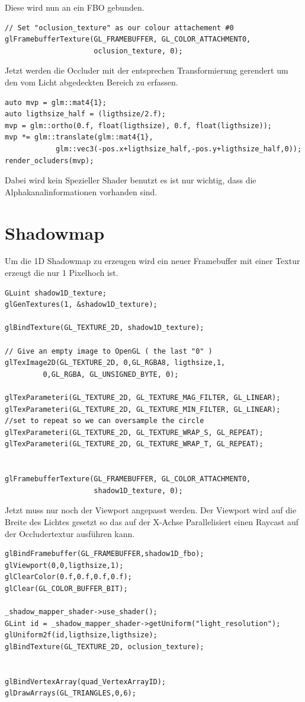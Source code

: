 Diese wird nun an ein FBO gebunden.
\begin{lstlisting}
// Set "oclusion_texture" as our colour attachement #0
glFramebufferTexture(GL_FRAMEBUFFER, GL_COLOR_ATTACHMENT0, 
					 oclusion_texture, 0);
\end{lstlisting}

Jetzt werden die Occluder mit der entsprechen Transformierung gerendert um den vom Licht abgedeckten Bereich zu erfassen.
\begin{lstlisting}
auto mvp = glm::mat4{1};
auto ligthsize_half = (ligthsize/2.f);
mvp = glm::ortho(0.f, float(ligthsize), 0.f, float(ligthsize));
mvp *= glm::translate(glm::mat4{1},
			glm::vec3(-pos.x+ligthsize_half,-pos.y+ligthsize_half,0));
render_ocluders(mvp);
\end{lstlisting}

Dabei wird kein Spezieller Shader benutzt es ist nur wichtig, dass die Alphakanalinformationen vorhanden sind.

\section{Shadowmap}
Um die 1D Shadowmap zu erzeugen wird ein neuer Framebuffer mit einer Textur erzeugt die nur 1 Pixelhoch ist.
\begin{lstlisting}
GLuint shadow1D_texture;
glGenTextures(1, &shadow1D_texture);

glBindTexture(GL_TEXTURE_2D, shadow1D_texture);

// Give an empty image to OpenGL ( the last "0" )
glTexImage2D(GL_TEXTURE_2D, 0,GL_RGBA8, ligthsize,1,
		 0,GL_RGBA, GL_UNSIGNED_BYTE, 0);

glTexParameteri(GL_TEXTURE_2D, GL_TEXTURE_MAG_FILTER, GL_LINEAR);
glTexParameteri(GL_TEXTURE_2D, GL_TEXTURE_MIN_FILTER, GL_LINEAR);
//set to repeat so we can oversample the circle
glTexParameteri(GL_TEXTURE_2D, GL_TEXTURE_WRAP_S, GL_REPEAT); 
glTexParameteri(GL_TEXTURE_2D, GL_TEXTURE_WRAP_T, GL_REPEAT);


glFramebufferTexture(GL_FRAMEBUFFER, GL_COLOR_ATTACHMENT0,
					 shadow1D_texture, 0);
\end{lstlisting}

Jetzt muss nur noch der Viewport angepasst werden. Der Viewport wird auf die Breite des Lichtes gesetzt so das auf der X-Achse Parallelisiert einen Raycast auf der Occludertextur ausführen kann.

\begin{lstlisting}
glBindFramebuffer(GL_FRAMEBUFFER,shadow1D_fbo);
glViewport(0,0,ligthsize,1);
glClearColor(0.f,0.f,0.f,0.f);
glClear(GL_COLOR_BUFFER_BIT);

_shadow_mapper_shader->use_shader();
GLint id = _shadow_mapper_shader->getUniform("light_resolution");
glUniform2f(id,ligthsize,ligthsize);
glBindTexture(GL_TEXTURE_2D, oclusion_texture);


glBindVertexArray(quad_VertexArrayID);
glDrawArrays(GL_TRIANGLES,0,6);
\end{lstlisting}

